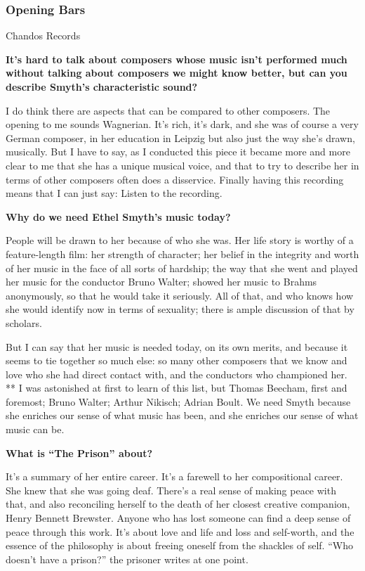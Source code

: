 \hypertarget{opening-bars}{%
\subsubsection{Opening Bars}\label{opening-bars}}

Chandos Records

\textbf{It's hard to talk about composers whose music isn't performed
much without talking about composers we might know better, but can you
describe Smyth's characteristic sound?}

I do think there are aspects that can be compared to other composers.
The opening to me sounds Wagnerian. It's rich, it's dark, and she was of
course a very German composer, in her education in Leipzig but also just
the way she's drawn, musically. But I have to say, as I conducted this
piece it became more and more clear to me that she has a unique musical
voice, and that to try to describe her in terms of other composers often
does a disservice. Finally having this recording means that I can just
say: Listen to the recording.

\textbf{Why do we need Ethel Smyth's music today?}

People will be drawn to her because of who she was. Her life story is
worthy of a feature-length film: her strength of character; her belief
in the integrity and worth of her music in the face of all sorts of
hardship; the way that she went and played her music for the conductor
Bruno Walter; showed her music to Brahms anonymously, so that he would
take it seriously. All of that, and who knows how she would identify now
in terms of sexuality; there is ample discussion of that by scholars.

But I can say that her music is needed today, on its own merits, and
because it seems to tie together so much else: so many other composers
that we know and love who she had direct contact with, and the
conductors who championed her. ** I was astonished at first to learn of
this list, but Thomas Beecham, first and foremost; Bruno Walter; Arthur
Nikisch; Adrian Boult. We need Smyth because she enriches our sense of
what music has been, and she enriches our sense of what music can be.

\textbf{What is ``The Prison'' about?}

It's a summary of her entire career. It's a farewell to her
compositional career. She knew that she was going deaf. There's a real
sense of making peace with that, and also reconciling herself to the
death of her closest creative companion, Henry Bennett Brewster. Anyone
who has lost someone can find a deep sense of peace through this work.
It's about love and life and loss and self-worth, and the essence of the
philosophy is about freeing oneself from the shackles of self. ``Who
doesn't have a prison?'' the prisoner writes at one point.

